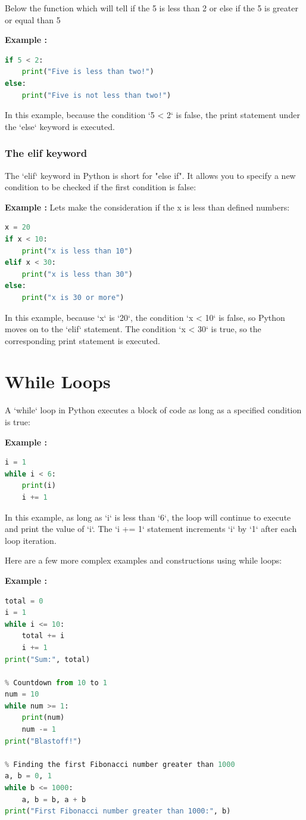 \documentclass[12pt]{book}
\newtheorem{Example}{Example}[chapter]
\renewenvironment{Example}{\begin{trivlist}\item\relax
\textbf{Example \thesection: }}{\end{trivlist}}
\begin{document}
Below the function which will tell if the 5 is less than 2 or else if the 5 is greater or equal than 5
\begin{Example}
\begin{lstlisting}[language=Python]
if 5 < 2:
    print("Five is less than two!")
else:
    print("Five is not less than two!")
\end{lstlisting}
\end{Example}
In this example, because the condition `5 < 2` is false, the print statement under the `else` keyword is executed.


\subsubsection{The elif keyword}
The `elif` keyword in Python is short for "else if". It allows you to specify a new condition to be checked if the first condition is false:
\begin{Example}
Lets make the consideration if the x is less than defined numbers:
\begin{lstlisting}[language=Python]
x = 20
if x < 10:
    print("x is less than 10")
elif x < 30:
    print("x is less than 30")
else:
    print("x is 30 or more")
\end{lstlisting}
\end{Example}
In this example, because `x` is `20`, the condition `x < 10` is false, so Python moves on to the `elif` statement. The condition `x < 30` is true, so the corresponding print statement is executed.


\section{While Loops}

A `while` loop in Python executes a block of code as long as a specified condition is true:
\begin{Example}
\begin{lstlisting}[language=Python]
i = 1
while i < 6:
    print(i)
    i += 1
\end{lstlisting}
\end{Example}
In this example, as long as `i` is less than `6`, the loop will continue to execute and print the value of `i`. The `i += 1` statement increments `i` by `1` after each loop iteration.

Here are a few more complex examples and constructions using while loops:

\begin{Example}
\begin{lstlisting}[language=Python]
% Sum of numbers from 1 to 10
total = 0
i = 1
while i <= 10:
    total += i
    i += 1
print("Sum:", total)

% Countdown from 10 to 1
num = 10
while num >= 1:
    print(num)
    num -= 1
print("Blastoff!")

% Finding the first Fibonacci number greater than 1000
a, b = 0, 1
while b <= 1000:
    a, b = b, a + b
print("First Fibonacci number greater than 1000:", b)
\end{lstlisting}
\end{Example}
\end{document}
